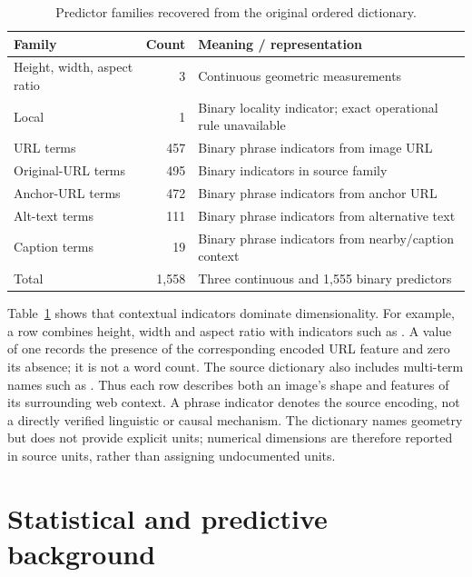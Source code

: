 \documentclass[11pt,a4paper]{article}
\newcommand{\code}[1]{\texttt{\detokenize{#1}}}
\begin{document}
\begin{table}[H]\centering\small
\caption{Predictor families recovered from the original ordered dictionary.}
\begin{tabular}{lrl}\toprule Family & Count & Meaning / representation\\\midrule
Height, width, aspect ratio & 3 & Continuous geometric measurements\\
Local & 1 & Binary locality indicator; exact operational rule unavailable\\
URL terms & 457 & Binary phrase indicators from image URL\\
Original-URL terms & 495 & Binary indicators in source \code{origurl} family\\
Anchor-URL terms & 472 & Binary phrase indicators from anchor URL\\
Alt-text terms & 111 & Binary phrase indicators from alternative text\\
Caption terms & 19 & Binary phrase indicators from nearby/caption context\\\midrule
Total & 1,558 & Three continuous and 1,555 binary predictors\\\bottomrule
\end{tabular}\label{tab:families}
\end{table}
Table~\ref{tab:families} shows that contextual indicators dominate dimensionality. For example, a row combines height, width and aspect ratio with indicators such as \code{url*ads}. A value of one records the presence of the corresponding encoded URL feature and zero its absence; it is not a word count. The source dictionary also includes multi-term names such as \code{url*images+buttons}. Thus each row describes both an image's shape and features of its surrounding web context. A phrase indicator denotes the source encoding, not a directly verified linguistic or causal mechanism. The dictionary names geometry but does not provide explicit units; numerical dimensions are therefore reported in source units, rather than assigning undocumented units.
\section{Statistical and predictive background}
\end{document}
